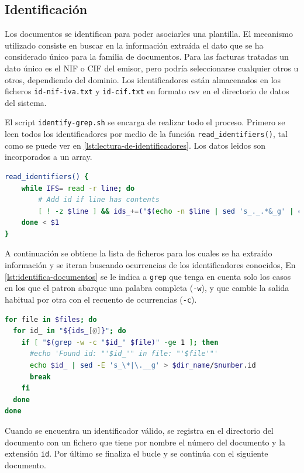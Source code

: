 \subsection{Identificación}
\label{subsec:impl-identificacion}

Los documentos se identifican para poder asociarles una plantilla. El mecanismo utilizado consiste en buscar en la información extraída el dato que se ha considerado único para la familia de documentos. Para las facturas tratadas un dato único es el NIF o CIF del emisor, pero podría seleccionarse cualquier otros u otros, dependiendo del dominio. Los identificadores están almacenados en los ficheros \verb|id-nif-iva.txt| y \verb|id-cif.txt| en formato \acrshort{csv} en el directorio de datos del sistema.

El script \verb|identify-grep.sh| se encarga de realizar todo el proceso. Primero se leen todos los identificadores por medio de la función \verb|read_identifiers()|, tal como se puede ver en \ref{lst:lectura-de-identificadores}. Los datos leidos son incorporados a un array.

\begin{lstlisting}[language=bash,caption={Lectura de identificadores},label=lst:lectura-de-identificadores]
read_identifiers() {
    while IFS= read -r line; do
        # Add id if line has contents
        [ ! -z $line ] && ids_+=("$(echo -n $line | sed 's_._.*&_g' | cut -c 3-)")
    done < $1
}
\end{lstlisting}

A continuación se obtiene la lista de ficheros para los cuales se ha extraído información y se iteran buscando ocurrencias de los identificadores conocidos, En \ref{lst:identifica-documentos} se le indica a \verb|grep| que tenga en cuenta solo los casos en los que el patron abarque una palabra completa (\verb|-w|), y que cambie la salida habitual por otra con el recuento de ocurrencias (\verb|-c|).

\begin{lstlisting}[language=bash,caption={Identificación de los documentos},label=lst:identifica-documentos]
for file in $files; do
  for id_ in "${ids_[@]}"; do
    if [ "$(grep -w -c "$id_" $file)" -ge 1 ]; then
      #echo 'Found id: "'$id_'" in file: "'$file'"'
      echo $id_ | sed -E 's_\*|\.__g' > $dir_name/$number.id
      break
    fi
  done
done
\end{lstlisting}

Cuando se encuentra un identificador válido, se registra en el directorio del documento con un fichero que tiene por nombre el número del documento y la extensión \verb|id|. Por último se finaliza el bucle y se continúa con el siguiente documento.

